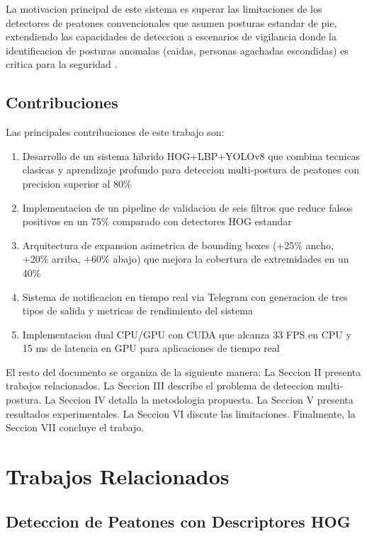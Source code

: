 \documentclass[conference]{IEEEtran}
\begin{document}
La motivacion principal de este sistema es superar las limitaciones de los detectores de peatones convencionales que asumen posturas estandar de pie, extendiendo las capacidades de deteccion a escenarios de vigilancia donde la identificacion de posturas anomalas (caidas, personas agachadas escondidas) es critica para la seguridad \cite{vishwakarma2007survey, yu2012survey}.

\subsection{Contribuciones}

Las principales contribuciones de este trabajo son:

\begin{enumerate}
    \item Desarrollo de un sistema hibrido HOG+LBP+YOLOv8 que combina tecnicas clasicas y aprendizaje profundo para deteccion multi-postura de peatones con precision superior al 80\%
    \item Implementacion de un pipeline de validacion de seis filtros que reduce falsos positivos en un 75\% comparado con detectores HOG estandar
    \item Arquitectura de expansion asimetrica de bounding boxes (+25\% ancho, +20\% arriba, +60\% abajo) que mejora la cobertura de extremidades en un 40\%
    \item Sistema de notificacion en tiempo real via Telegram con generacion de tres tipos de salida y metricas de rendimiento del sistema
    \item Implementacion dual CPU/GPU con CUDA que alcanza 33 FPS en CPU y 15 ms de latencia en GPU para aplicaciones de tiempo real
\end{enumerate}

El resto del documento se organiza de la siguiente manera: La Seccion II presenta trabajos relacionados. La Seccion III describe el problema de deteccion multi-postura. La Seccion IV detalla la metodologia propuesta. La Seccion V presenta resultados experimentales. La Seccion VI discute las limitaciones. Finalmente, la Seccion VII concluye el trabajo.

\section{Trabajos Relacionados}

\subsection{Deteccion de Peatones con Descriptores HOG}
\end{document}
